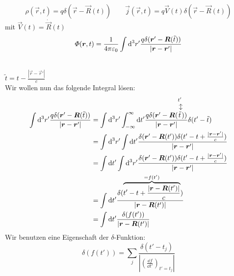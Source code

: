 \begin{minipage}{.7\linewidth}
	\begin{equation*}
	\rho(\vec{r},t) = q \delta (\vec{r} - \vec{R}(t)) \qquad \vec{j}(\vec{r},t) = q \vec{V}(t) \delta(\vec{r} - \vec{R}(t))
	\end{equation*}
	mit $ \vec{V}(t) = \dot{\vec{R}}(t) $\\
	\begin{equation*}
	\varPhi(\bm{r},t) = \frac{1}{4\pi\varepsilon_0} \int \textrm{d}^3 r' \frac{q \delta(\bm{r}' - \bm{R}(\tilde{t}))}{|\bm{r} - \bm{r}'|}
	\end{equation*}
\end{minipage}%
\begin{minipage}{.3\linewidth}
	\flushright
\end{minipage}%
\\
$ \tilde{t} = t - \frac{|\vec{r} - \vec{r}'|}{c} $\\
Wir wollen nun das folgende Integral lösen:
\begin{align*}
\int \dd^3 r' \frac{q \delta(\vec{r}' - \vec{R}(\tilde{t}))}{|\vec{r} - \vec{r}'|} &= \int \dd^3 r' \int_{-\infty}^{\infty} \dd t' \frac{q \delta(\vec{r}' - \vec{R}(\custoup{\leftrightarrow}{\tilde{t}}{t'}))}{|\vec{r} - \vec{r}'|} \delta(t' - \tilde{t})\\
&= \int \dd^3 r' \int \dd t' \frac{\delta(\vec{r}' - \vec{R}(t')) \delta(t' - t + \frac{|\vec{r} - \vec{r}'|}{c})}{|\vec{r} - \vec{r}'|}\\
&= \int \dd t' \int \dd^3 r' \frac{\delta(\vec{r}' - \vec{R}(t')) \delta(t' - t + \frac{|\vec{r} - \vec{r}'|}{c})}{|\vec{r} - \vec{r}'|}\\
&= \int \dd t' \frac{\delta(\ob{t' - t + \frac{|\vec{r} - \vec{R}(t')|}{c}}^{= f(t')})}{|\vec{r} - \vec{R}(t')|}\\
&= \int \dd t' \frac{\delta(f(t'))}{|\vec{r} - \vec{R}(t')|}
\end{align*}
Wir benutzen eine Eigenschaft der $ \delta $-Funktion:
\begin{equation*}
\delta (f(t')) = \sum_{j} \frac{\delta(t' - t_j)}{\left|\left(\frac{\dd f}{\dd t'}\right)_{t' = t_j}\right|}
\end{equation*}

